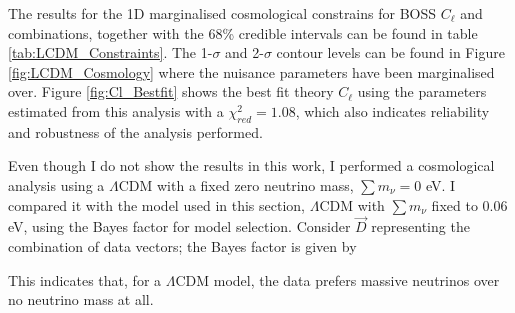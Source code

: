 \qquad The results for the 1D marginalised cosmological constrains for BOSS $C_{\ell}$ and combinations, together with the 68\% credible intervals can be found in table \ref{tab:LCDM_Constraints}. The 1-$\sigma$ and 2-$\sigma$ contour levels can be found in Figure \ref{fig:LCDM_Cosmology} where the nuisance parameters have been marginalised over. Figure \ref{fig:Cl_Bestfit} shows the best fit theory $C_{\ell}$ using the parameters estimated from this analysis with a $\chi^2_{red} = 1.08$, which also indicates reliability and robustness of the analysis performed. 

\qquad Even though I do not show the results in this work, I performed a cosmological analysis using a $\Lambda$CDM with a fixed zero neutrino mass, $\sum m_{\nu} = 0$ eV. I compared it with the model used in this section, $\Lambda$CDM with $\sum m_{\nu}$ fixed to $0.06$ eV, using the Bayes factor for model selection. Consider $\vec{D}$ representing the combination of data vectors; the Bayes factor is given by

\noindent This indicates that, for a $\Lambda$CDM model, the data prefers massive neutrinos over no neutrino mass at all.



